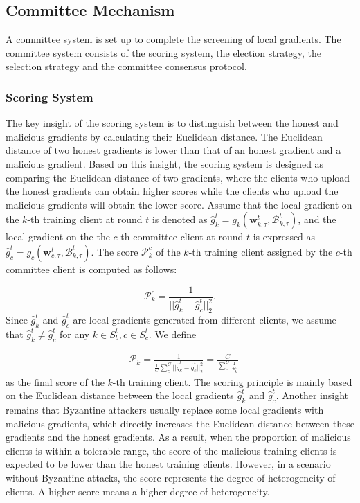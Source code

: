 \documentclass[10pt,journal,compsoc]{IEEEtran}
\newcommand{\w}{\mathbf{w}}
\newcommand{\B}{\mathcal{B}}
\newcommand{\p}{\mathcal{P}}
\begin{document}
\subsection{Committee Mechanism}

A committee system is set up to complete the screening of local gradients. The committee system consists of the scoring system, the election strategy, the selection strategy and the committee consensus protocol. 

\subsubsection{Scoring System}

The key insight of the scoring system is to distinguish between the honest and malicious gradients by calculating their Euclidean distance. The Euclidean distance of two honest gradients is lower than that of an honest gradient and a malicious gradient. Based on this insight, the scoring system is designed as comparing the Euclidean distance of two gradients, where the clients who upload the honest gradients can obtain higher scores while the clients who upload the malicious gradients will obtain the lower score. Assume that the local gradient on the $k$-th training client at round $t$ is denoted as $\hat{g}_{k}^{t} = g_{k}(\w_{k,\tau}^{t},\B_{k,\tau}^{t})$, and the local gradient on the the $c$-th committee client at round $t$ is expressed as $\hat{g}_c^{t} = g_c(\w_{c,\tau}^{t},\B_{k,\tau}^{t})$. The score $\p_k^c$ of the $k$-th training client assigned by the $c$-th committee client is computed as follows:

\begin{equation}
\p_k^c = \frac{1}{||\hat{g}_k^{t} - \hat{g}_c^{t}||^2_2}.
\end{equation}
Since $\hat{g}_k^t$ and $\hat{g}_c^t$ are local gradients generated from different clients, we assume that $\hat{g}_k^t \neq \hat{g}_c^t$ for any $k \in S_b^t, c \in S_c^t$. We define 

\begin{equation}\label{computeScore}
\begin{split}
&\p_k =\frac{1}{\frac{1}{C}\sum_c^C ||\hat{g}_k^{t} - \hat{g}_c^{t}||^2_2} = \frac{C}{\sum_c^C\frac{1}{\p_k^c}}
\end{split}
\end{equation} as the final score of the $k$-th training client. The scoring principle is mainly based on the Euclidean distance between the local gradients $\hat{g}_k^{t}$ and $\hat{g}_c^{t}$. Another insight remains that Byzantine attackers usually replace some local gradients with malicious gradients, which directly increases the Euclidean distance between these gradients and the honest gradients. As a result, when the proportion of malicious clients is within a tolerable range, the score of the malicious training clients is expected to be lower than the honest training clients. However, in a scenario without Byzantine attacks, the score represents the degree of heterogeneity of clients. A higher score means a higher degree of heterogeneity. 
\end{document}
